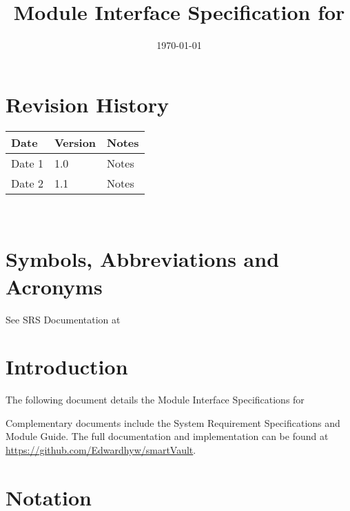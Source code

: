 \documentclass[12pt, titlepage]{article}
\begin{document}
\title{Module Interface Specification for \progname{}}

\author{\authname}

\date{\today}

\maketitle


\section{Revision History}

\begin{tabularx}{\textwidth}{p{3cm}p{2cm}X}
\toprule {\bf Date} & {\bf Version} & {\bf Notes}\\
\midrule
Date 1 & 1.0 & Notes\\
Date 2 & 1.1 & Notes\\
\bottomrule
\end{tabularx}

~\newpage

\section{Symbols, Abbreviations and Acronyms}

See SRS Documentation at 


\newpage

\tableofcontents

\newpage


\section{Introduction}

The following document details the Module Interface Specifications for

Complementary documents include the System Requirement Specifications
and Module Guide.  The full documentation and implementation can be
found at \url{https://github.com/Edwardhyw/smartVault}.  

\section{Notation}
\end{document}

